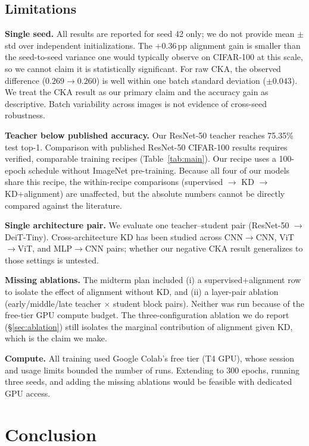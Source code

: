\documentclass[11pt, letterpaper]{article}
\begin{document}
\subsection{Limitations}

\label{sec:limitations}

\textbf{Single seed.} All results are reported for seed 42 only; we do not
provide mean $\pm$ std over independent initializations. The $+0.36$\,pp
alignment gain is smaller than the seed-to-seed variance one would typically
observe on CIFAR-100 at this scale, so we cannot claim it is statistically
significant. For raw CKA, the
observed difference ($0.269 \to 0.260$) is well within one batch standard
deviation ($\pm 0.043$). We treat the CKA result as our primary claim and
the accuracy gain as descriptive. Batch variability across images is not
evidence of cross-seed robustness.

\textbf{Teacher below published accuracy.} Our ResNet-50 teacher reaches
75.35\% test top-1. Comparison with published ResNet-50
CIFAR-100 results requires verified, comparable training recipes
(Table~\ref{tab:main}). Our recipe uses a 100-epoch schedule without
ImageNet pre-training. Because all four of our models share this
recipe, the within-recipe comparisons (supervised $\to$ KD $\to$ KD+alignment)
are unaffected, but the absolute numbers cannot be directly compared
against the literature.

\textbf{Single architecture pair.} We evaluate one teacher--student pair
(ResNet-50 $\to$ DeiT-Tiny). Cross-architecture KD has been studied across
CNN$\to$CNN, ViT$\to$ViT, and MLP$\to$CNN pairs; whether our negative CKA
result generalizes to those settings is untested.

\textbf{Missing ablations.} The midterm plan included (i) a
supervised+alignment row to isolate the effect of alignment without KD, and
(ii) a layer-pair ablation (early/middle/late teacher $\times$ student block
pairs). Neither was run because of the free-tier GPU compute budget. The
three-configuration ablation we do report (\S\ref{sec:ablation}) still isolates the
marginal contribution of alignment given KD, which is the claim we make.

\textbf{Compute.} All training used Google Colab's free tier (T4 GPU), whose
session and usage limits bounded the number of runs. Extending to 300 epochs,
running three seeds, and adding the missing ablations would be feasible with
dedicated GPU access.

\section{Conclusion}
\end{document}
